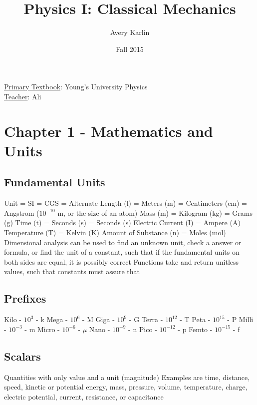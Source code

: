 \documentclass[11 pt, twoside]{article}
\newenvironment{outline*}
{
	\begin{outline}[enumerate]
	}
	{\end{outline}
}
\begin{document}
\title{Physics I: Classical Mechanics}
\author{Avery Karlin}
\date{Fall 2015}
\newcommand{\textbook}{Young's University Physics}
\newcommand{\teacher}{Ali}

\maketitle
\newpage
\hypertarget{content}{\tableofcontents}
\vspace{11pt}
\noindent
\underline{Primary Textbook}: \textbook\\
\underline{Teacher}: \teacher
\newpage

\section{Chapter 1 - Mathematics and Units}
\subsection{Fundamental Units}
\begin{outline*}
\1 Unit = SI = CGS = Alternate
\1 Length (l) = Meters (m) = Centimeters (cm) = Angstrom ($10^{-10}$ m, or the size of an atom)
\1 Mass (m) = Kilogram (kg) = Grams (g)
\1 Time (t) = Seconds (s) = Seconds (s)
\1 Electric Current (I) = Ampere (A)
\1 Temperature (T) = Kelvin (K)
\1 Amount of Substance (n) = Moles (mol)
\1 Dimensional analysis can be used to find an unknown unit, check a answer or formula, or find the unit of a constant, such that if the fundamental units on both sides are equal, it is possibly correct
\2 Functions take and return unitless values, such that constants must assure that
\end{outline*}
\subsection{Prefixes}
\begin{outline*}
\1 Kilo - $10^3$ - k
\1 Mega - $10^6$ - M
\1 Giga - $10^9$ - G
\1 Terra - $10^{12}$ - T
\1 Peta - $10^{15}$ - P
\1 Milli - $10^{-3}$ - m
\1 Micro - $10^{-6}$ - $\mu$
\1 Nano - $10^{-9}$ - n
\1 Pico - $10^{-12}$ - p
\1 Femto - $10^{-15}$ - f
\end{outline*}
\subsection{Scalars}
\begin{outline*}
\1 Quantities with only value and a unit (magnitude)
\1 Examples are time, distance, speed, kinetic or potential energy, mass, pressure, volume, temperature, charge, electric potential, current, resistance, or capacitance
\end{outline*}
\end{document}
